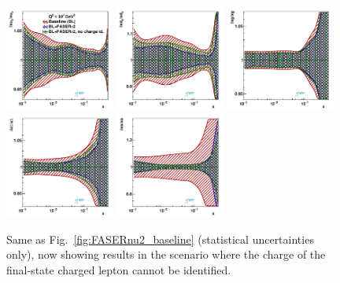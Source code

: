 \begin{figure}[t]
\centering
\includegraphics[width=0.32\textwidth]{plots/proton_fasernu2/nochargediscrimination/statOnly_FASERv2_q2_10000_pdf_uv_ratio.pdf}
\includegraphics[width=0.32\textwidth]{plots/proton_fasernu2/nochargediscrimination/statOnly_FASERv2_q2_10000_pdf_dv_ratio.pdf}
\includegraphics[width=0.32\textwidth]{plots/proton_fasernu2/nochargediscrimination/statOnly_FASERv2_q2_10000_pdf_g_ratio.pdf}\\
\includegraphics[width=0.32\textwidth]{plots/proton_fasernu2/nochargediscrimination/statOnly_FASERv2_q2_10000_pdf_Sea_ratio.pdf}
\includegraphics[width=0.32\textwidth]{plots/proton_fasernu2/nochargediscrimination/statOnly_FASERv2_q2_10000_pdf_s_ratio.pdf}
\caption{Same as Fig.~\ref{fig:FASERnu2_baseline} (statistical uncertainties only),
  now showing results in the scenario where the charge of the final-state charged lepton
  cannot be identified.
 }
\label{fig:FASERnu2_nochargeID}
\end{figure}


